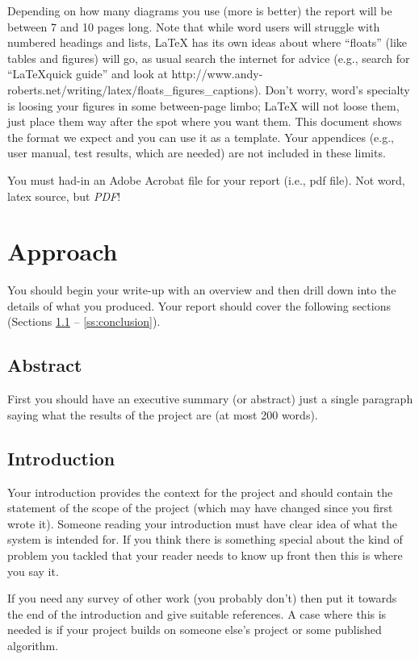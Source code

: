\documentclass[11pt,a4paper]{article}
\begin{document}
Depending on how many diagrams you use (more is better) the report
will be between 7 and 10 pages long. Note that while word users will
struggle with numbered headings and lists, \LaTeX\/ has its own ideas
about where ``floats'' (like tables and figures) will go, as usual
search the internet for advice (e.g., search for ``\LaTeX quick
guide'' and look at
http://www.andy-roberts.net/writing/latex/floats\_figures\_captions). Don't
worry, word's specialty is loosing your figures in some between-page
limbo; \LaTeX\/ will not loose them, just place them way after the
spot where you want them.  This document shows the format we expect
and you can use it as a template.  Your appendices (e.g., user manual,
test results, which are needed) are not included in these limits.

You must had-in an Adobe Acrobat file for your report (i.e., pdf
file). Not word, latex source, but \emph{PDF}!

\section{Approach}

You should begin your write-up with an overview and then drill down
into the details of what you produced. Your report should cover the
following sections (Sections \ref{ss:introduction} --
\ref{ss:conclusion}).

\subsection*{Abstract}
First you should have an executive summary (or abstract) just a single
paragraph saying what the results of the project are (at most 200
words).

\subsection{Introduction}
\label{ss:introduction}

Your introduction provides the context for the project and should
contain the statement of the scope of the project (which may have
changed since you first wrote it). Someone reading your introduction
must have clear idea of what the system is intended for. If you think
there is something special about the kind of problem you tackled that
your reader needs to know up front then this is where you say it.

If you need any survey of other work (you probably don't) then put it
towards the end of the introduction and give suitable references. A
case where this is needed is if your project builds on someone else's
project or some published algorithm.
\end{document}
